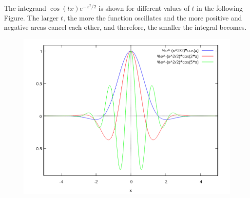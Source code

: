 The integrand $\cos(tx) e^{-x^2/2}$ is shown for different values of $t$ in the following Figure. The larger $t$, the more the function oscillates and the more positive and negative areas cancel each other, and therefore, the smaller the integral becomes.

\begin{figure}[H]
    \includegraphics[scale=0.7]{images/2022-03-21_plot_3.png}
\end{figure}


